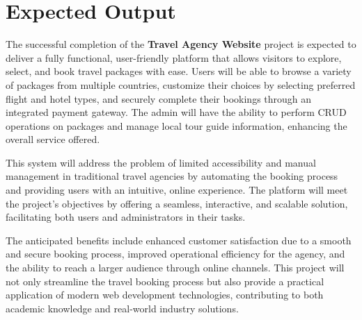 \section{Expected Output}

The successful completion of the \textbf{Travel Agency Website} project is expected to deliver a fully functional, user-friendly platform that allows visitors to explore, select, and book travel packages with ease. Users will be able to browse a variety of packages from multiple countries, customize their choices by selecting preferred flight and hotel types, and securely complete their bookings through an integrated payment gateway. The admin will have the ability to perform CRUD operations on packages and manage local tour guide information, enhancing the overall service offered.

This system will address the problem of limited accessibility and manual management in traditional travel agencies by automating the booking process and providing users with an intuitive, online experience. The platform will meet the project’s objectives by offering a seamless, interactive, and scalable solution, facilitating both users and administrators in their tasks.

The anticipated benefits include enhanced customer satisfaction due to a smooth and secure booking process, improved operational efficiency for the agency, and the ability to reach a larger audience through online channels. This project will not only streamline the travel booking process but also provide a practical application of modern web development technologies, contributing to both academic knowledge and real-world industry solutions.
